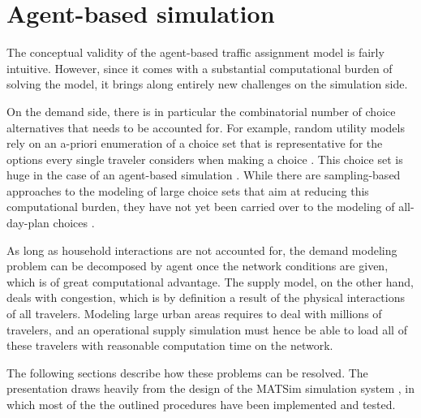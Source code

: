 
\section{Agent-based simulation}
\label{sec:agent-based-simul}

The conceptual validity of the agent-based traffic assignment model is fairly intuitive. However, since it comes with a substantial computational burden of solving the model, it brings along entirely new challenges on the simulation side.

On the demand side, there is in particular the combinatorial number of choice alternatives that needs  to be accounted for. For example, random utility models rely on an a-priori enumeration of a choice set that is representative for the options every single traveler considers when making a choice \citep[][]{ben-akiva-1985}. This choice set is huge in the case of an agent-based simulation \citep[][]{bowman-1998}. While there are sampling-based approaches to the modeling of large choice sets that aim at reducing this computational burden, they have not yet been carried over to the modeling of all-day-plan choices \citep[][]{ben-akiva-1985, frejinger-2009, bierlaire-2011a}.

As long as household interactions are not accounted for, the demand modeling problem can be decomposed by agent once the network conditions are given, which is of great computational advantage. The supply model, on the other hand, deals with congestion, which is by definition a result of the physical interactions of all travelers. Modeling large urban areas requires to deal with millions of travelers, and an operational supply simulation must hence be able to load all of these travelers with reasonable computation time on the network. 

The following sections describe how these problems can be
resolved. The presentation draws heavily from the design of the MATSim
simulation system \citep{RaneyNagel2006traf-framework, matsim}, in which most of the the outlined 
procedures have been implemented and tested.

